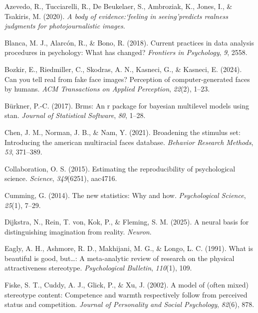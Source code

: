 \documentclass[
  jou,
  floatsintext,
  longtable,
  nolmodern,
  notxfonts,
  notimes,
  colorlinks=true,linkcolor=blue,citecolor=blue,urlcolor=blue]{apa7}
\newlength{\cslhangindent}
\newenvironment{CSLReferences}[2] %
 {\begin{list}{}{%
  \setlength{\itemindent}{0pt}
  \setlength{\leftmargin}{0pt}
  \setlength{\parsep}{0pt}
  \ifodd #1
   \setlength{\leftmargin}{\cslhangindent}
   \setlength{\itemindent}{-1\cslhangindent}
  \fi
  \setlength{\itemsep}{#2\baselineskip}}}
 {\end{list}}
\begin{document}
\label{refs}
\begin{CSLReferences}{1}{0}
Azevedo, R., Tucciarelli, R., De Beukelaer, S., Ambroziak, K., Jones,
I., \& Tsakiris, M. (2020). \emph{A body of evidence:`feeling in
seeing'predicts realness judgments for photojournalistic images.}

Blanca, M. J., Alarcón, R., \& Bono, R. (2018). Current practices in
data analysis procedures in psychology: What has changed?
\emph{Frontiers in Psychology}, \emph{9}, 2558.

Bozkir, E., Riedmiller, C., Skodras, A. N., Kasneci, G., \& Kasneci, E.
(2024). Can you tell real from fake face images? Perception of
computer-generated faces by humans. \emph{ACM Transactions on Applied
Perception}, \emph{22}(2), 1--23.

Bürkner, P.-C. (2017). Brms: An r package for bayesian multilevel models
using stan. \emph{Journal of Statistical Software}, \emph{80}, 1--28.

Chen, J. M., Norman, J. B., \& Nam, Y. (2021). Broadening the stimulus
set: Introducing the american multiracial faces database. \emph{Behavior
Research Methods}, \emph{53}, 371--389.

Collaboration, O. S. (2015). Estimating the reproducibility of
psychological science. \emph{Science}, \emph{349}(6251), aac4716.

Cumming, G. (2014). The new statistics: Why and how. \emph{Psychological
Science}, \emph{25}(1), 7--29.

Dijkstra, N., Rein, T. von, Kok, P., \& Fleming, S. M. (2025). A neural
basis for distinguishing imagination from reality. \emph{Neuron}.

Eagly, A. H., Ashmore, R. D., Makhijani, M. G., \& Longo, L. C. (1991).
What is beautiful is good, but\ldots: A meta-analytic review of research
on the physical attractiveness stereotype. \emph{Psychological
Bulletin}, \emph{110}(1), 109.

Fiske, S. T., Cuddy, A. J., Glick, P., \& Xu, J. (2002). A model of
(often mixed) stereotype content: Competence and warmth respectively
follow from perceived status and competition. \emph{Journal of
Personality and Social Psychology}, \emph{82}(6), 878.


\end{CSLReferences}
\end{document}
